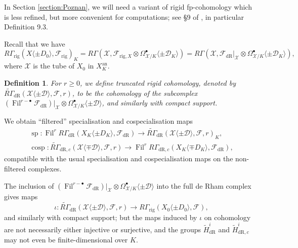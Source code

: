 \documentclass[cjm]{ipart}
\theoremstyle{plain}
\newtheorem{definition}[theorem]{Definition}
\theoremstyle{remark}
\DeclareMathOperator{\cosp}{cosp}
\DeclareMathOperator{\Fil}{Fil}
\newcommand{\RGt}{\widetilde{R\Gamma}}
\newcommand{\cD}{\mathcal{D}}
\newcommand{\cX}{\mathcal{X}}
\newcommand{\dR}{\mathrm{dR}}
\newcommand{\rig}{\mathrm{rig}}
\newcommand{\sF}{\mathscr{F}}
\newcommand{\wH}{\widetilde{H}}
\numberwithin{equation}{subsection}
\renewcommand{\ge}{\geqslant}
\begin{document}
 In Section \ref{section:Poznan}, we will need a variant of rigid fp-cohomology which is less refined, but more convenient for computations; see \S 9 of \cite{besser00}, in particular Definition 9.3.

  Recall that we have
  \[ R\Gamma_{\rig}(X\langle \pm D_0\rangle,\sF_{\rig})_K = R\Gamma( \cX, \sF_{\rig, X} \otimes \Omega^\bullet_{\cX/K}\langle \pm \cD_K\rangle) = R\Gamma( \cX, \sF_{\dR}|_{\cX} \otimes \Omega^\bullet_{\cX/K}\langle \pm \cD_K\rangle), \]
  where $\cX$ is the tube of $X_0$ in $X_K^{\mathrm{an}}$.

  \begin{definition}
   For $r \ge 0$, we define \emph{truncated rigid cohomology}, denoted by $\RGt_{\dR}(\cX\langle \pm \cD\rangle,\sF, r)$, to be the cohomology of the subcomplex $\left(\Fil^{r-\bullet} \sF_{\dR}\right)|_{\cX} \otimes \Omega^\bullet_{\cX/K}\langle \pm \cD\rangle$, and similarly with compact support.   \end{definition}

   \begin{note}\label{note:filtspcosp}
    We obtain ``filtered'' specialisation and cospecialisation maps
    \begin{gather*}
     \operatorname{sp}: \Fil^r R\Gamma_{\dR}(X_K\langle \pm D_K\rangle, \sF_{\dR})\to  \RGt_{\dR}(\cX\langle \pm \cD\rangle,\sF, r)_K,\\
     \cosp: \RGt_{\dR, c}(\cX\langle \mp \cD\rangle, \sF, r) \to \Fil^r R\Gamma_{\dR, c}(X_K\langle \mp D_K\rangle, \sF_{\dR}),
    \end{gather*}
    compatible with the usual specialisation and cospecialisation maps on the non-filtered complexes.
   \end{note}
      
  \begin{remark}
   The inclusion of $\left(\Fil^{r-\bullet} \sF_{\dR}\right)|_{\cX} \otimes \Omega^\bullet_{\cX/K}\langle \pm \cD\rangle$ into the full de Rham complex gives maps
   \[ \iota: \RGt_{\dR}(\cX\langle \pm \cD\rangle,\sF, r) \to R\Gamma_{\rig}(X_0\langle \pm D_0\rangle,\sF),\]
   and similarly with compact support; but the maps induced by $\iota$ on cohomology are not necessarily either injective or surjective, and the groups $\wH^i_{\dR}$ and $\wH^i_{\dR,c}$ may not even be finite-dimensional over $K$.
  \end{remark}
      
\end{document}
